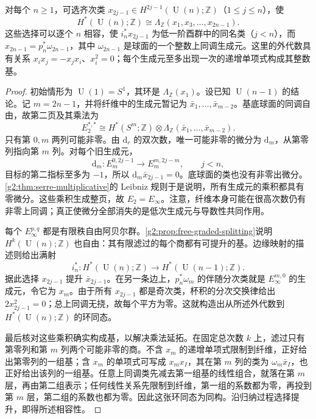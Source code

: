 \begin{theorem}\label{g2:thm:unitary-cohomology}
	对每个 \(n\ge1\)，可选齐次类 \(x_{2j-1}\in H^{2j-1}(\operatorname{U}(n);\mathbb Z)\)（\(1\le j\le n\)），使
	\[
		H^*(\operatorname{U}(n);\mathbb Z)\cong\Lambda_{\mathbb Z}(x_1,x_3,\ldots,x_{2n-1}).
	\]
	这些选择可以逐个 \(n\) 相容，使 \(i_n^*x_{2j-1}\) 为低一阶酉群中的同名类（\(j<n\)），而 \(x_{2n-1}=p_n^*\omega_{2n-1}\)，其中 \(\omega_{2n-1}\) 是球面的一个整数上同调生成元。这里的外代数具有关系 \(x_ix_j=-x_jx_i\)、\(x_i^2=0\)；每个生成元至多出现一次的递增单项式构成其整数基。
\end{theorem}
\begin{proof}
	初始情形为 \(\operatorname{U}(1)=S^1\)，其环是 \(\Lambda_{\mathbb Z}(x_1)\)。设已知 \(\operatorname{U}(n-1)\) 的结论。记 \(m=2n-1\)，并将纤维中的生成元暂记为 \(\bar x_1,\ldots,\bar x_{m-2}\)。基底球面的同调自由，故第二页及其乘法为
	\[
		E_2^{*,*}\cong H^*(S^m;\mathbb Z)\otimes\Lambda_{\mathbb Z}(\bar x_1,\ldots,\bar x_{m-2}).
	\]
	只有第 \(0,m\) 两列可能非零。由 \(\mathrm d_r\) 的双次数，唯一可能非零的微分为 \(\mathrm d_m\)，从第零列指向第 \(m\) 列。对每个旧生成元，
	\[
		\mathrm d_m:E_m^{0,2j-1}\longrightarrow E_m^{m,2j-m},\qquad j<n,
	\]
	目标的第二指标至多为 \(-1\)，所以 \(\mathrm d_m\bar x_{2j-1}=0\)。底球面的类也没有非零出微分。\cref{g2:thm:serre-multiplicative}的 Leibniz 规则于是说明，所有生成元的乘积都具有零微分。这些乘积生成整页，故 \(E_2=E_\infty\)。注意，纤维本身可能在很高次数仍有非零上同调；真正使微分全部消失的是低次生成元与导数性共同作用。

	每个 \(E_\infty^{p,q}\) 都是有限秩自由阿贝尔群。\cref{g2:prop:free-graded-splitting}说明 \(H^k(\operatorname{U}(n);\mathbb Z)\) 也自由：其有限滤过的每个商都有可提升的基。边缘映射的描述则给出满射
	\[
		i_n^*:H^*(\operatorname{U}(n);\mathbb Z)\longrightarrow H^*(\operatorname{U}(n-1);\mathbb Z).
	\]
	据此选择 \(x_{2j-1}\) 提升 \(\bar x_{2j-1}\)。在另一条边上，\(p_n^*\omega_m\) 的伴随分次类就是 \(E_\infty^{m,0}\) 的生成元，令它为 \(x_m\)。由于所有 \(x_{2j-1}\) 都是奇次类，杯积的分次交换律给出 \(2x_{2j-1}^2=0\)；总上同调无挠，故每个平方为零。这就构造出从所述外代数到 \(H^*(\operatorname{U}(n);\mathbb Z)\) 的环同态。

	最后核对这些乘积确实构成基，以解决乘法延拓。在固定总次数 \(k\) 上，滤过只有第零列和第 \(m\) 列两个可能非零的商。不含 \(x_m\) 的递增单项式限制到纤维，正好给出第零列的一组基；含 \(x_m\) 的单项式可写成 \(x_m x_I\)，其在第 \(m\) 列的类为 \(\omega_m\bar x_I\)，也正好给出该列的一组基。任意上同调类先减去第一组基的线性组合，就落在第 \(m\) 层，再由第二组表示；任何线性关系先限制到纤维，第一组的系数都为零，再投到第 \(m\) 层，第二组的系数也都为零。因此这张环同态为同构。沿归纳过程选择提升，即得所述相容性。
\end{proof}

